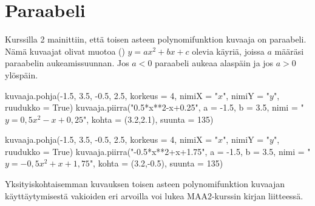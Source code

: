 \section{Paraabeli}



Kurssilla 2 mainittiin, että toisen asteen polynomifunktion kuvaaja on paraabeli. Nämä kuvaajat olivat muotoa () $y=ax^2+bx+c$ olevia käyriä, joissa $a$ määräsi paraabelin aukeamissuunnan. Jos $a<0$ paraabeli aukeaa alaspäin ja jos $a>0$ ylöspäin. 

\begin{kuva}
    kuvaaja.pohja(-1.5, 3.5, -0.5, 2.5, korkeus = 4, nimiX = "$x$", nimiY = "$y$", ruudukko = True)
    kuvaaja.piirra("0.5*x**2-x+0.25", a = -1.5, b = 3.5, nimi = "$y= 0,5x^2-x+0,25$", kohta = (3.2,2.1), suunta = 135)
\end{kuva}

\begin{kuva}
    kuvaaja.pohja(-1.5, 3.5, -0.5, 2.5, korkeus = 4, nimiX = "$x$", nimiY = "$y$", ruudukko = True)
    kuvaaja.piirra("-0.5*x**2+x+1.75", a = -1.5, b = 3.5, nimi = "$y= -0,5x^2+x+1,75$", kohta = (3.2,-0.5), suunta = 135)
\end{kuva}

Yksityiskohtaisemman kuvauksen toisen asteen polynomifunktion kuvaajan käyttäytymisestä vakioiden eri arvoilla voi lukea MAA2-kurssin kirjan liitteessä.

